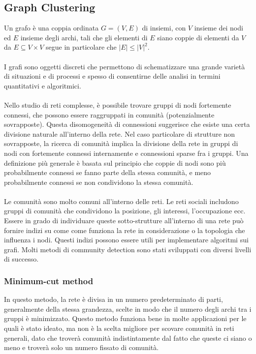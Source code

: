 \subsection{Graph Clustering}
Un grafo è una coppia ordinata $ G = (V, E)$ di insiemi, con $V$ insieme dei nodi ed $E$ insieme degli archi, tali che gli elementi di $E$ siano coppie di elementi da $V$ da $ E \subseteq V\times V$ segue in particolare che  $|E|\le |V|^2$.
\\\\
I grafi sono oggetti discreti che permettono di schematizzare una grande varietà di situazioni e di processi e spesso di consentirne delle analisi in termini quantitativi e algoritmici.
\\\\
Nello studio di reti complesse, è possibile trovare gruppi di nodi fortemente connessi, che possono essere raggruppati in comunità (potenzialmente sovrapposte). Questa disomogeneità di connessioni suggerisce che esiste una certa divisione naturale all’interno della rete. Nel caso particolare di strutture non sovrapposte, la ricerca di comunità implica la divisione della rete in gruppi di nodi con fortemente connessi internamente e connessioni sparse fra i gruppi.
Una definizione più generale è basata sul principio che coppie di nodi sono più probabilmente connessi se fanno parte della stessa comunità, e meno probabilmente connessi se non condividono la stessa comunità.
\\\\
Le comunità sono molto comuni all’interno delle reti. Le reti sociali includono gruppi di comunità che condividono la posizione, gli interessi, l’occupazione ecc. Essere in grado di individuare queste sotto-strutture all’interno di una rete può fornire indizi  su come come funziona la rete in considerazione o la topologia che influenza i nodi. Questi indizi possono essere utili per implementare algoritmi sui grafi. Molti metodi di community detection sono stati sviluppati con diversi livelli di successo.

\subsubsection{Minimum-cut method}
In questo metodo, la rete è divisa in un numero predeterminato di parti, generalmente della stessa grandezza, scelte in modo che il numero degli archi tra i gruppi è minimizzato. Questo metodo funziona bene in molte applicazioni per le quali è stato ideato, ma non è la scelta migliore per scovare comunità in reti generali, dato che troverà comunità indistintamente dal fatto che queste ci siano o meno e troverà solo un numero fissato di comunità.

